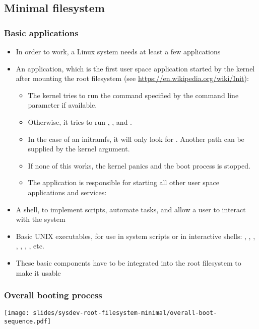 \subsection{Minimal filesystem}
\begin{frame}
  \frametitle{Basic applications}
  \fontsize{10}{10}\selectfont
  \begin{itemize}
  \item In order to work, a Linux system needs at least a few
    applications
  \item An  application, which is the first user space
    application started by the kernel after mounting the root
    filesystem (see \url{https://en.wikipedia.org/wiki/Init}):
    \begin{itemize}
    \item The kernel tries to run the command specified by the
           command line parameter if available.
    \item Otherwise, it tries to run , ,
       and .
    \item In the case of an initramfs, it will only look for
      . Another path can be supplied by the 
      kernel argument.
    \item If none of this works, the kernel panics and the boot
      process is stopped.
    \item The  application is responsible for starting all other
      user space applications and services:
    \end{itemize}
  \item A shell, to implement scripts, automate tasks, and allow a user
        to interact with the system
  \item Basic UNIX executables, for use in system scripts or in
        interactive shells: , , , ,
        , , , etc.
  \item These basic components have to be integrated into the root
    filesystem to make it usable
  \end{itemize}
\end{frame}

\begin{frame}
  \frametitle{Overall booting process}
  \begin{center}
    \texttt{[image: slides/sysdev-root-filesystem-minimal/overall-boot-sequence.pdf]}
  \end{center}
\end{frame}
